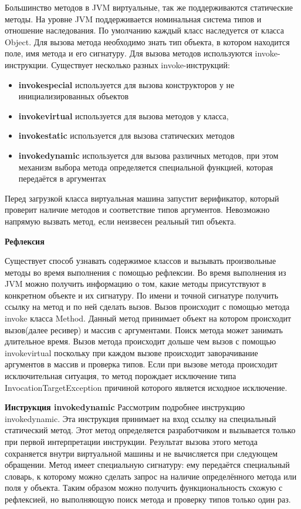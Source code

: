 Большинство методов в JVM виртуальные, так же поддерживаются статические методы.
На уровне JVM поддерживается номинальная система типов и отношение наследования. По умолчанию каждый класс наследуется от класса Object. Для вызова метода необходимо знать тип объекта, в котором находится поле, имя метода и его сигнатуру. Для вызова методов используются invoke-инструкции. Существует несколько разных invoke-инструкций:
\begin{itemize}
    \item \textbf{invokespecial} используется для вызова конструкторов у не инициализированных объектов
    \item \textbf{invokevirtual} используется для вызова методов у класса,
    \item \textbf{invokestatic} используется для вызова статических методов
    \item \textbf{invokedynamic} используется для вызова различных методов, при этом механизм выбора метода определяется специальной функцией, которая передаётся в аргументах
\end{itemize}
Перед загрузкой класса виртуальная машина запустит верификатор, который проверит наличие методов и соответствие типов аргументов. Невозможно напрямую вызвать метод, если неизвесен реальный тип объекта.

\textbf{Рефлексия}

Существует способ узнавать содержимое классов и вызывать произвольные методы во время выполнения с помощью рефлексии. Во время выполнения из JVM можно получить информацию о том, какие методы присутствуют в конкретном объекте и их сигнатуру. По имени и точной сигнатуре получить ссылку на метод и по ней сделать вызов. Вызов происходит с помощью метода invoke класса Method. Данный метод принимает объект на котором происходит вызов(далее ресивер) и массив с аргументами. Поиск метода может занимать длительное время. Вызов метода происходит дольше чем вызов с помощью invokevirtual поскольку при каждом вызове происходит заворачивание аргументов в массив и проверка типов. Если при вызове метода происходит исключительная ситуация, то метод порождает исключение типа InvocationTargetException причиной которого является исходное исключение.

\textbf{Инструкция invokedynamic}
Рассмотрим подробнее инструкцию invokedynamic. Эта инструкция принимает на вход ссылку на специальный статический метод. Этот метод определяется разработчиком и вызывается только при первой интерпретации инструкции. Результат вызова этого метода сохраняется внутри виртуальной машины и не вычисляется при следующем обращении. Метод имеет специальную сигнатуру: ему передаётся специальный словарь, к которому можно сделать запрос на наличие определённого метода или поля у объекта. Таким образом можно получить функциональность схожую с рефлексией, но выполняющую поиск метода и проверку типов только один раз.